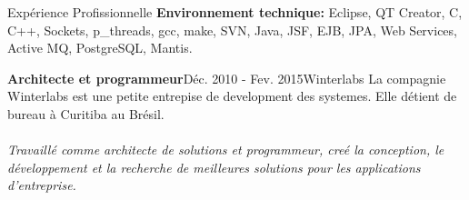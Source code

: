 \documentclass{resume}
\begin{document}
\begin{rSection}{Expérience Profissionnelle}
      {\fontsize{8}{9}\selectfont \textbf{Environnement technique:} Eclipse, QT Creator, C, C++, Sockets, p\_threads, gcc, make, SVN, Java, JSF, EJB, JPA, Web Services, Active MQ, PostgreSQL, Mantis.}\\

    \begin{rSubsection}{\fontsize{12}{14}\selectfont \bf Architecte et programmeur}{\fontsize{12}{14}\selectfont Déc. 2010 - Fev. 2015}{\fontsize{12}{14}\selectfont Winterlabs}{}
    La compagnie Winterlabs est une petite entrepise de development des systemes. Elle
détient de bureau à Curitiba au Brésil. \\\\
\textit{Travaillé comme architecte de solutions et programmeur, creé la conception, le développement et la recherche de meilleures solutions pour les applications d'entreprise.}
    \end{rSubsection}


\end{rSection}
\end{document}
